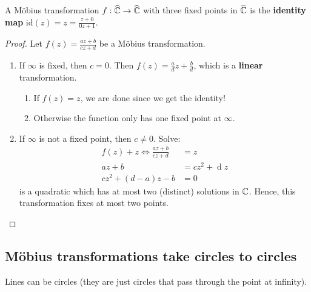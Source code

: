 \documentclass[12pt]{article}
\renewcommand{\d}{\ensuremath{\operatorname{d}}}
\begin{document}
\begin{theorem}
    A Möbius transformation $f:\widehat{\mathbb{C}}\to\widehat{\mathbb{C}}$ with three fixed points in $\widehat{\mathbb{C}}$ is the \textbf{identity map} $\mathrm{id}(z)=z=\frac{z+0}{0z+1}$.
\end{theorem}
\begin{proof}
    Let $f(z)=\frac{az+b}{cz+d}$ be a Möbius transformation.
    \begin{enumerate}
        \item If $\infty$ is fixed, then $c=0$. Then $f(z)=\frac{a}{d}z+\frac{b}{d}$, which is a \textbf{linear} transformation.\begin{enumerate}
            \item If $f(z)=z$, we are done since we get the identity!
            \item Otherwise the function only has one fixed point at $\infty$.
        \end{enumerate}
        \item If $\infty$ is not a fixed point, then $c\neq 0$. Solve:\begin{align*}
            f(z)+z \Leftrightarrow \frac{az+b}{cz+d}&=z\\
            az+b&=cz^2+\d z\\
            cz^2+(d-a)z-b&=0
        \end{align*}
        is a quadratic which has at most two (distinct) solutions in $\mathbb{C}$. Hence, this transformation fixes at most two points.
    \end{enumerate}
\end{proof}

\subsection{Möbius transformations take circles to circles}
\rmk Lines can be circles (they are just circles that pass through the point at infinity).
\end{document}
